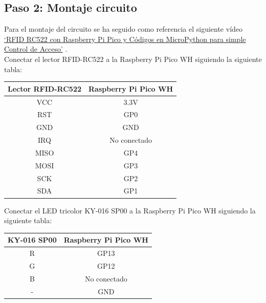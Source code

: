 \documentclass{article}
\begin{document}
\subsection{Paso 2: Montaje circuito}
Para el montaje del circuito se ha seguido como referencia el siguiente vídeo \href{https://www.youtube.com/watch?v=bvn_o39uXac}{`RFID RC522 con Raspberry Pi Pico y Códigos en MicroPython para simple Control de Acceso'} \cite{computadoras2022rfid}.\\
Conectar el lector RFID-RC522 a la Raspberry Pi Pico WH siguiendo la siguiente tabla:

\begin{center}
	\begin{tabular}{|c|c|}
		\hline
		\textbf{Lector RFID-RC522} & \textbf{Raspberry Pi Pico WH} \\
		\hline
		VCC & 3.3V \\
		\hline
		RST & GP0 \\
		\hline
		GND & GND \\
		\hline
		IRQ & No conectado \\
		\hline
		MISO & GP4 \\
		\hline
		MOSI & GP3 \\
		\hline
		SCK & GP2 \\
		\hline
		SDA & GP1 \\
		\hline
	\end{tabular}
\end{center}

\vspace{0.3cm}

Conectar el LED tricolor KY-016 SP00 a la Raspberry Pi Pico WH siguiendo la siguiente tabla:
\begin{center}
	\begin{tabular}{|c|c|}
		\hline
		\textbf{KY-016 SP00} & \textbf{Raspberry Pi Pico WH} \\
		\hline
		R & GP13 \\
		\hline
		G & GP12 \\
		\hline
		B & No conectado \\
		\hline
		- & GND \\
		\hline
	\end{tabular}
\end{center}
\end{document}
